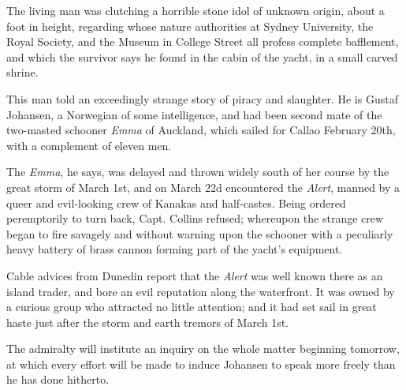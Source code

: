 \documentclass{newspaper1920}
\def\minipageheight{37}
\begin{document}
\begin{multicols}{3}
\begin{minipage}[t][\minipageheight\baselineskip]{2\columnwidth+1\columnsep}
\begin{multicols}{2}
The living man was clutching a horrible stone idol of unknown origin,
about a foot in height, regarding whose nature authorities at Sydney
University, the Royal Society, and the Museum in College Street all
profess complete bafflement, and which the survivor says he found in
the cabin of the yacht, in a small carved shrine.

This man told an exceedingly strange story of piracy and slaughter.
He is Gustaf Johansen, a Norwegian of some intelligence, and had been
second mate of the two-masted schooner \emph{Emma} of Auckland, which
sailed for Callao February 20th, with a complement of eleven men.

The \emph{Emma}, he says, was delayed and thrown widely south of her
course by the great storm of March 1st, and on March 22d encountered
the \emph{Alert}, manned by a queer and evil-looking crew of Kanakas
and half-castes.  Being ordered peremptorily to turn back,
Capt. Collins refused; whereupon the strange crew began to fire
savagely and without warning upon the schooner with a peculiarly
heavy battery of brass cannon forming part of the yacht's equipment.

Cable advices from Dunedin report that the \emph{Alert} was well known
there as an island trader, and bore an evil reputation along the
waterfront.  It was owned by a curious group who attracted no little
attention; and it had set sail in great haste just after the storm and
earth tremors of March 1st.


The admiralty will institute an inquiry on the whole matter beginning
tomorrow, at which every effort will be made to induce Johansen to
speak more freely than he has done hitherto.

\end{multicols}

\vspace{-\baselineskip}\fullrule

\end{minipage}



\fullrule



\halfrule



\begin{minipage}[t][\minipageheight\baselineskip]{2\columnwidth+1\columnsep}
\end{minipage}



\fullrule



\end{multicols}
\end{document}
